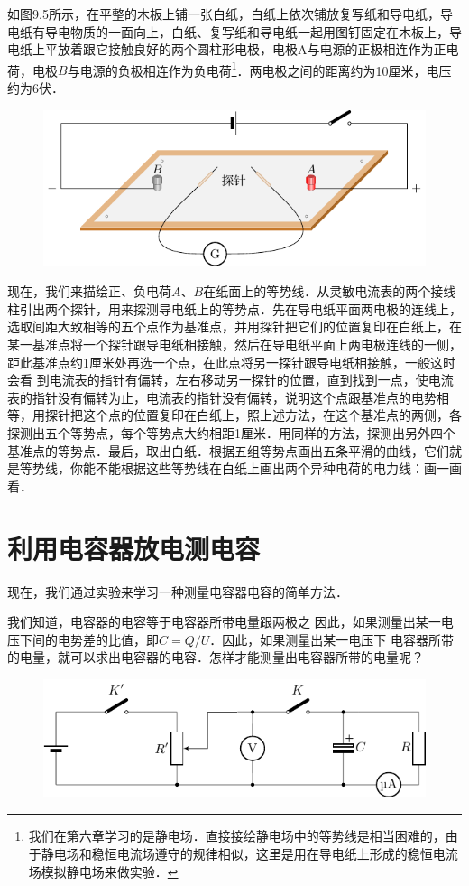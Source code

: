 如图9.5所示，在平整的木板上铺一张白纸，白纸上依次铺放复写纸和导电纸，导电纸有导电物质的一面向上，白纸、复写纸和导电纸一起用图钉固定在木板上，导电纸上平放着跟它接触良好的两个圆柱形电极，电极A与电源的正极相连作为正电荷，电极$B$与电源的负极相连作为负电荷\footnote{我们在第六章学习的是静电场．直接接绘静电场中的等势线是相当困难的，由于静电场和稳恒电流场遵守的规律相似，这里是用在导电纸上形成的稳恒电流场模拟静电场来做实验．}．两电极之间的距离约为10厘米，电压约为6伏．
\begin{figure}[htbp]
    \centering
    \includegraphics{fig/B/9-5.pdf}
    \caption{}\label{fig_B_9-5}
\end{figure}

现在，我们来描绘正、负电荷$A$、$B$在纸面上的等势线．从灵敏电流表的两个接线柱引出两个探针，用来探测导电纸上的等势点．先在导电纸平面两电极的连线上，选取间距大致相等的五个点作为基准点，并用探针把它们的位置复印在白纸上，在某一基准点将一个探针跟导电纸相接触，然后在导电纸平面上两电极连线的一侧，距此基准点约1厘米处再选一个点，在此点将另一探针跟导电纸相接触，一般这时会看
到电流表的指针有偏转，左右移动另一探针的位置，直到找到一点，使电流表的指针没有偏转为止，电流表的指针没有偏转，说明这个点跟基准点的电势相等，用探针把这个点的位置复印在白纸上，照上述方法，在这个基准点的两侧，各探测出五个等势点，每个等势点大约相距1厘米．用同样的方法，探测出另外四个基准点的等势点．最后，取出白纸．根据五组等势点画出五条平滑的曲线，它们就是等势线，你能不能根据这些等势线在白纸上画出两个异种电荷的电力线：画一画看．

\section{利用电容器放电测电容}
现在，我们通过实验来学习一种测量电容器电容的简单方法．

我们知道，电容器的电容等于电容器所带电量跟两极之
因此，如果测量出某一电压下间的电势差的比值，即$C=Q/U$．因此，如果测量出某一电压下
电容器所带的电量，就可以求出电容器的电容．怎样才能测量出电容器所带的电量呢？
\begin{figure}[htbp]
    \centering
    \includegraphics{fig/B/9-6.pdf}
    \caption{}\label{fig_B_9-6}
\end{figure}

